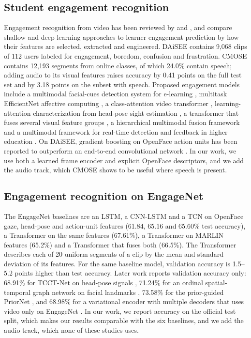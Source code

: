\documentclass[pdflatex,iicol,sn-basic]{sn-jnl}
\begin{document}
\subsection{Student engagement recognition}\label{sec:rw_engagement}

Engagement recognition from video has been reviewed by \citet{qarbal2025review} and \citet{mandia2023review}, and \citet{theophilus2026review} compare shallow and deep learning approaches to learner engagement prediction by how their features are selected, extracted and engineered. DAiSEE \citep{gupta2016daisee} contains 9,068 clips of 112 users labeled for engagement, boredom, confusion and frustration. CMOSE \citep{wu2024cmose} contains 12,193 segments from online classes, of which 24.0\% contain speech; adding audio to its visual features raises accuracy by 0.41 points on the full test set and by 3.18 points on the subset with speech. Proposed engagement models include a multimodal facial-cues detection system for e-learning \citep{gupta2023facialcues}, multitask EfficientNet affective computing \citep{thiruthuvanathan2024multitask}, a class-attention video transformer \citep{ai2024classattention}, learning-attention characterization from head-pose sight estimation \citep{mo2024headpose}, a transformer that fuses several visual feature groups \citep{xie2025msctrans}, a hierarchical multimodal fusion framework \citep{qin2026glpfusion} and a multimodal framework for real-time detection and feedback in higher education \citep{zhao2026multimodal}. On DAiSEE, gradient boosting on OpenFace action units has been reported to outperform an end-to-end convolutional network \citep{das2025optimizing}. In our work, we use both a learned frame encoder and explicit OpenFace descriptors, and we add the audio track, which CMOSE shows to be useful where speech is present.

\subsection{Engagement recognition on EngageNet}\label{sec:rw_engagenet}

The EngageNet baselines \citep{singh2023engagenet} are an LSTM, a CNN-LSTM and a TCN on OpenFace gaze, head-pose and action-unit features (61.84, 65.16 and 65.60\% test accuracy), a Transformer on the same features (67.61\%), a Transformer on MARLIN features (65.2\%) and a Transformer that fuses both (66.5\%). The Transformer describes each of 20 uniform segments of a clip by the mean and standard deviation of its features. For the same baseline model, validation accuracy is 1.5--5.2 points higher than test accuracy. Later work reports validation accuracy only: 68.91\% for TCCT-Net on head-pose signals \citep{vedernikov2024tcct}, 71.24\% for an ordinal spatial-temporal graph network on facial landmarks \citep{abedi2024stgcn}, 73.58\% for the prior-guided PriorNet \citep{vedernikov2026priornet}, and 68.98\% for a variational encoder with multiple decoders that uses video only on EngageNet \citep{augusma2026vemd}. In our work, we report accuracy on the official test split, which makes our results comparable with the six baselines, and we add the audio track, which none of these studies uses.
\end{document}
